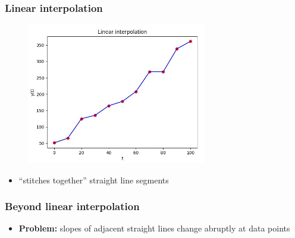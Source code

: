 \documentclass[english,14pt]{beamer}
\newcommand\red[1]{{\color{red} #1}}
\newcommand\blue[1]{{\color{blue} #1}}
\begin{document}

\begin{frame}[fragile]

\frametitle{Linear interpolation}

\vspace*{-3mm}
\begin{figure}[ht]
	\centering
	\includegraphics[width=0.7\textwidth]{figures/Week6MonLinearInterp}
\end{figure}
\vspace*{-5mm}
\begin{itemize}
	\item ``stitches together'' straight line segments
\end{itemize}

\end{frame}


\begin{frame}[fragile]

\frametitle{Beyond linear interpolation}

%

\begin{itemize}
	\item[] \textbf{Problem:} slopes of adjacent \blue{straight lines} change abruptly at \red{data points}
\end{itemize}

\end{frame}
\end{document}
